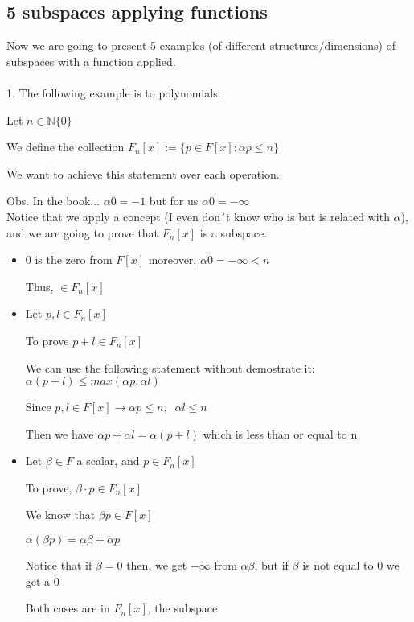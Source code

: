 \documentclass{article}
\begin{document}
\subsection*{5 subspaces applying functions}
Now we are going to present 5 examples (of different structures/dimensions) of subspaces with a function applied.
\\
\\
1. The following example is to polynomials.

Let \(n \in \mathbb{N}\{0\}\)

We define the collection \(F_n[x] := \{p \in F[x] : \alpha p \leq n\}\)

We want to achieve this statement over each operation.

Obs. In the book... \(\alpha 0 = -1\) but for us \(\alpha 0 = - \infty\)
\\

Notice that we apply a concept (I even don´t know who is but is related with \(\alpha\)), and we are going to prove that \(F_n[x]\) is a subspace.
\\

\begin{itemize}
    \item 0 is the zero from \(F[x]\) moreover, \(\alpha 0 = -\infty < n\)

Thus, \( \in F_n[x]\)

    \item Let \(p, l \in F_n[x]\)

To prove \(p+l \in F_n[x]\)

We can use the following statement without demostrate it: \(\alpha(p+l) \leq max(\alpha p, \alpha l)\)

Since \(p,l \in F[x] \rightarrow \alpha p \leq n,\;\; \alpha l \leq n \)

Then we have \(\alpha p + \alpha l = \alpha (p+l)\) which is less than or equal to n

    \item Let \(\beta \in F\) a scalar, and \(p \in F_n[x]\) 

To prove, \(\beta \cdot p \in F_n[x]\)

We know that \(\beta p \in F[x]\)

\(\alpha(\beta p) = \alpha \beta + \alpha p\)

Notice that if \(\beta = 0\) then, we get \(-\infty\) from \(\alpha \beta\), but if \(\beta\) is not equal to 0 we get a 0

Both cases are in \(F_n[x]\), the subspace
\end{itemize}
\end{document}
